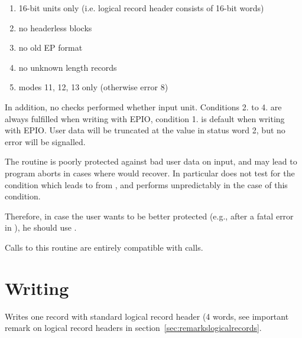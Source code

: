 \begin{enumerate}
\item 16-bit units only (i.e. logical record header consists of 16-bit
       words)
\item no headerless blocks
\item no old EP format
\item no unknown length records
\item modes 11, 12, 13 only (otherwise error 8)
\end{enumerate}
 
In addition, no checks performed whether input unit.
Conditions 2. to 4. are always fulfilled when writing with EPIO,
condition 1. is default when writing with EPIO.
User data will be truncated at the value in status word 2,
but no error will be signalled.
 
The routine is poorly protected against bad user data on input,
and may lead to program aborts in cases where  would recover.
In particular  does not test for the condition which leads to
 from , and performs unpredictably in the case of this
condition.
 
Therefore, in case the user wants to be better protected (e.g.,
after a fatal error in ), he should use .

Calls to this routine are entirely compatible with  calls.

\section{Writing}


Writes one record with standard logical record header (4 words, see
important remark on logical record headers in 
section~\ref{sec:remarkslogicalrecords}.

